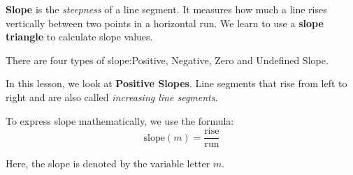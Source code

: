 \documentclass[12pt, a4paper, addpoints]{exam}
\begin{document}





\pgfmathsetseed{\number\pdfrandomseed}



\begin{mdframed}[backgroundcolor=gray!20] %
 \textbf{Slope} is the \textit{steepness} of a line segment. It measures how much a line rises vertically between two points in a horizontal run. We learn to use a \textbf{slope triangle}  to calculate slope values.

There are four types of slope:Positive,  Negative, Zero and Undefined Slope.


In this lesson, we look at \textbf{Positive Slopes}.  Line segments that rise from left to right and are also called  \textit{increasing line segments}. 

To express slope mathematically, we use the formula:
\[ \text{slope} (m) = \frac{\text{rise}}{\text{run}} \]

Here, the slope is denoted by the variable letter \(m\).
\end{mdframed}
\end{document}
